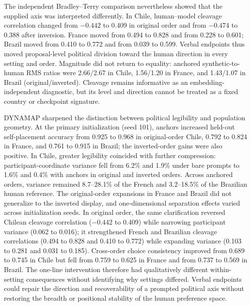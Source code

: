 \documentclass[unnumsec,webpdf,modern,large]{oup-authoring-template}
\begin{document}
The independent Bradley--Terry comparison nevertheless showed that the supplied axis was interpreted differently. In Chile, human--model cleavage correlation changed from $-0.442$ to 0.409 in original order and from $-0.474$ to 0.388 after inversion. France moved from 0.494 to 0.828 and from 0.228 to 0.601; Brazil moved from 0.410 to 0.772 and from 0.039 to 0.599. Verbal endpoints thus moved proposal-level political division toward the human direction in every setting and order. Magnitude did not return to equality: anchored synthetic-to-human RMS ratios were 2.66/2.67 in Chile, 1.56/1.20 in France, and 1.43/1.07 in Brazil (original/inverted). Cleavage remains informative as an embedding-independent diagnostic, but its level and direction cannot be treated as a fixed country or checkpoint signature.

DYNAMAP sharpened the distinction between political legibility and population geometry. At the primary initialization (seed 101), anchors increased held-out self-placement accuracy from 0.925 to 0.968 in original-order Chile, 0.792 to 0.824 in France, and 0.761 to 0.915 in Brazil; the inverted-order gains were also positive. In Chile, greater legibility coincided with further compression: participant-coordinate variance fell from 6.2\% and 1.9\% under bare prompts to 1.6\% and 0.4\% with anchors in original and inverted orders. Across anchored orders, variance remained 8.7--28.1\% of the French and 3.2--18.5\% of the Brazilian human reference. The original-order expansions in France and Brazil did not generalize to the inverted display, and one-dimensional separation effects varied across initialization seeds. In original order, the same clarification reversed Chilean cleavage correlation ($-0.442$ to 0.409) while narrowing participant variance (0.062 to 0.016); it strengthened French and Brazilian cleavage correlations (0.494 to 0.828 and 0.410 to 0.772) while expanding variance (0.103 to 0.281 and 0.031 to 0.185). Cross-order choice consistency improved from 0.689 to 0.745 in Chile but fell from 0.759 to 0.625 in France and from 0.737 to 0.569 in Brazil. The one-line intervention therefore had qualitatively different within-setting consequences without identifying why settings differed. Verbal endpoints could repair the direction and recoverability of a prompted political axis without restoring the breadth or positional stability of the human preference space.
\end{document}
